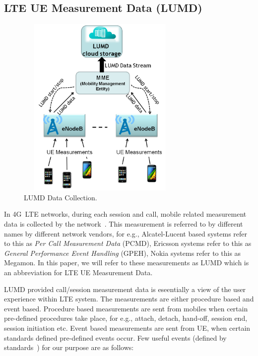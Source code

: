 \documentclass[conference, 10pt]{IEEEtran}
\begin{document}
\subsection{LTE UE Measurement Data (LUMD)}

\begin{figure}[t]
\begin{center}
\includegraphics[height=3.5in,width=3.2in]{./pcmd-coll-arch.png}
\caption{\label{fig:lumd_arch}
{\small LUMD Data Collection.}}
\end{center}
\end{figure}

In 4G~LTE networks, during each session and call, mobile related measurement data is
collected by the network~\cite{ltebook}. This measurement is referred to by different
names by different network vendors, for e.g., Alcatel-Lucent based systems refer to
this as {\em Per Call Measurement Data} (PCMD), Ericsson systems refer to this as
{\em General Performance Event Handling} (GPEH), Nokia systems refer to this as
Megamon. In this paper, we will refer to these measurements as LUMD which is an
abbreviation for LTE UE Measurement Data.


LUMD provided call/session measurement data is eseentially a view of the user experience
within LTE system. The measurements are either procedure based and event based.
Procedure based measurements are sent from mobiles when certain pre-defined procedures
take place, for e.g., attach, detach, hand-off, session end, session initiation etc.
Event based measurements are sent from UE, when certain standards defined pre-defined events
occur. Few useful events (defined by standards~\cite{TS36.331}) for our purpose are as follows:
\end{document}
